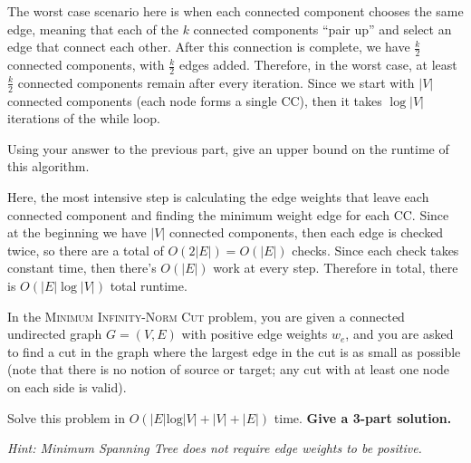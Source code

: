 \documentclass[11pt]{article}
\begin{document}
\begin{subparts}
\begin{solution}
	The worst case scenario here is when each connected component chooses the same edge, meaning that each 
	of the $k$ connected components ``pair up'' and select an edge that connect each other. After this 
	connection is complete, we have $\frac{k}{2}$ connected components, with $\frac{k}{2}$ edges added. 
	Therefore, in the worst case, at least $\frac{k}{2}$ connected components remain after every iteration. 
	Since we start with $|V|$ connected components (each node forms a single CC), then it takes $\log|V|$ 
	iterations of the while loop. 
\end{solution}
\subpart Using your answer to the previous part, give an upper bound on the runtime of this algorithm. 

\begin{solution}
	Here, the most intensive step is calculating the edge weights that leave each connected component and 
	finding the minimum weight edge for each CC. Since at the beginning we have $|V|$ connected 
	components, then each edge is checked twice, so there are a total of $O(2|E|) = O(|E|)$ checks. 
	Since each check takes constant time, then there's $O(|E|)$ work at every step.
	Therefore in total, there is $O(|E| \log |V|)$ total runtime. 
\end{solution}
\end{subparts}

\pagebreak
{}
In the \textsc{Minimum Infinity-Norm Cut} problem, you are given a connected undirected graph $G=(V, E)$ with positive edge weights $w_e$, and you are asked to find a cut in the graph where the largest edge in the cut is as small as possible (note that there is no notion of source or target; any cut with at least one node on each side is valid). 

Solve this problem in $O(|E|\text{log}|V| + |V| + |E|)$ time. \textbf{Give a 3-part solution.}

\textit{Hint: Minimum Spanning Tree does not require edge weights to be positive.}
\end{document}
